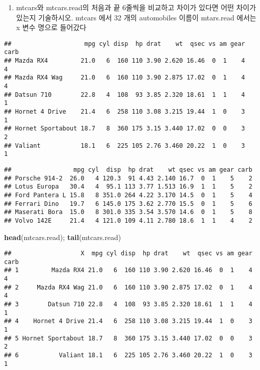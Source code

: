 \documentclass[]{article}
\newenvironment{Shaded}{\begin{snugshade}}{\end{snugshade}}
\newcommand{\KeywordTok}[1]{\textcolor[rgb]{0.13,0.29,0.53}{\textbf{#1}}}
\newcommand{\CommentTok}[1]{\textcolor[rgb]{0.56,0.35,0.01}{\textit{#1}}}
\newcommand{\NormalTok}[1]{#1}
\providecommand{\tightlist}{%
  \setlength{\itemsep}{0pt}\setlength{\parskip}{0pt}}
\begin{document}
\begin{enumerate}
\def\labelenumi{\arabic{enumi})}
\setcounter{enumi}{4}
\tightlist
\item
  mtcars와 mtcars.read의 처음과 끝 6줄씩을 비교하고 차이가 있다면 어떤
  차이가 있는지 기술하시오. mtcars 에서 32 개의 automobiles 이름이
  mtars.read 에서는 x 변수 명으로 들어갔다
\end{enumerate}

\begin{Shaded}
\end{Shaded}

\begin{verbatim}
##                    mpg cyl disp  hp drat    wt  qsec vs am gear carb
## Mazda RX4         21.0   6  160 110 3.90 2.620 16.46  0  1    4    4
## Mazda RX4 Wag     21.0   6  160 110 3.90 2.875 17.02  0  1    4    4
## Datsun 710        22.8   4  108  93 3.85 2.320 18.61  1  1    4    1
## Hornet 4 Drive    21.4   6  258 110 3.08 3.215 19.44  1  0    3    1
## Hornet Sportabout 18.7   8  360 175 3.15 3.440 17.02  0  0    3    2
## Valiant           18.1   6  225 105 2.76 3.460 20.22  1  0    3    1
\end{verbatim}

\begin{verbatim}
##                 mpg cyl  disp  hp drat    wt qsec vs am gear carb
## Porsche 914-2  26.0   4 120.3  91 4.43 2.140 16.7  0  1    5    2
## Lotus Europa   30.4   4  95.1 113 3.77 1.513 16.9  1  1    5    2
## Ford Pantera L 15.8   8 351.0 264 4.22 3.170 14.5  0  1    5    4
## Ferrari Dino   19.7   6 145.0 175 3.62 2.770 15.5  0  1    5    6
## Maserati Bora  15.0   8 301.0 335 3.54 3.570 14.6  0  1    5    8
## Volvo 142E     21.4   4 121.0 109 4.11 2.780 18.6  1  1    4    2
\end{verbatim}

\begin{Shaded}
\begin{Highlighting}[]
\KeywordTok{head}\NormalTok{(mtcars.read); }\KeywordTok{tail}\NormalTok{(mtcars.read)}
\end{Highlighting}
\end{Shaded}

\begin{verbatim}
##                   X  mpg cyl disp  hp drat    wt  qsec vs am gear carb
## 1         Mazda RX4 21.0   6  160 110 3.90 2.620 16.46  0  1    4    4
## 2     Mazda RX4 Wag 21.0   6  160 110 3.90 2.875 17.02  0  1    4    4
## 3        Datsun 710 22.8   4  108  93 3.85 2.320 18.61  1  1    4    1
## 4    Hornet 4 Drive 21.4   6  258 110 3.08 3.215 19.44  1  0    3    1
## 5 Hornet Sportabout 18.7   8  360 175 3.15 3.440 17.02  0  0    3    2
## 6           Valiant 18.1   6  225 105 2.76 3.460 20.22  1  0    3    1
\end{verbatim}
\end{document}
